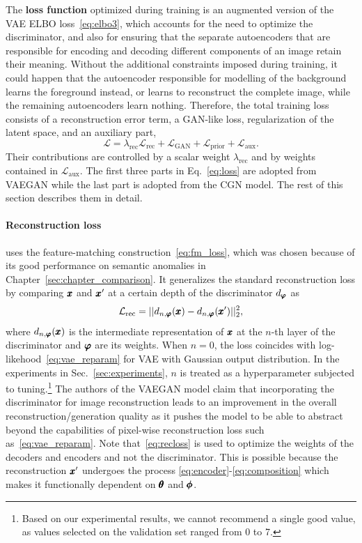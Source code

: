 The \textbf{loss function} optimized during training is an augmented version of the VAE ELBO loss~\eqref{eq:elbo3}, which accounts for the need to optimize the discriminator, and also for ensuring that the separate autoencoders that are responsible for encoding and decoding different components of an image retain their meaning. Without the additional constraints imposed during training, it could happen that the autoencoder responsible for modelling of the background learns the foreground instead, or learns to reconstruct the complete image, while the remaining autoencoders learn nothing. Therefore, the total training loss consists of a reconstruction error term, a GAN-like loss, regularization of the latent space, and an auxiliary part, 
\begin{equation}
    \mathcal{L} = \lambda_{\text{rec}}\mathcal{L}_{\text{rec}} + \mathcal{L}_{\text{GAN}} +  \mathcal{L}_{\text{prior}} + \mathcal{L}_{\text{aux}}.
    \label{eq:loss}
\end{equation}
Their contributions are controlled by a scalar weight $\lambda_{\text{rec}}$ and by weights contained in $\mathcal{L}_{\text{aux}}.$ The first three parts in Eq.~\eqref{eq:loss} are adopted from VAEGAN while the last part is adopted from the CGN model. The rest of this section describes them in detail.

\paragraph{Reconstruction loss} uses the feature-matching construction~\eqref{eq:fm_loss}, which was chosen because of its good performance on semantic anomalies in Chapter~\ref{sec:chapter_comparison}. It generalizes the standard reconstruction loss by comparing $\pmb{{x}}$ and $\pmb{{x}}'$ at a certain depth of the discriminator $d_{\pmb{{\varphi}}}$ as
\begin{equation} \label{eq:recloss}
     \mathcal{L}_{\text{rec}} = \vert \vert d_{n,\pmb{{\varphi}}}(\pmb{{x}}) - d_{n,\pmb{{\varphi}}}(\pmb{{x}}{'}) \vert \vert_2^2,
\end{equation} 
where $d_{n,\pmb{{\varphi}}}(\pmb{{x}})$ is the intermediate representation of $\pmb{{x}}$ at the $n$-th layer of the discriminator and $\pmb{{\varphi}}$ are its weights. When $n=0$, the loss coincides with log-likehood~\eqref{eq:vae_reparam} for VAE with Gaussian output distribution. In the experiments in Sec.~\ref{sec:experiments}, $n$ is treated as a hyperparameter subjected to tuning.\footnote{Based on our experimental results, we cannot recommend a single good value, as values selected on the validation set ranged from 0 to 7.} The authors of the VAEGAN model claim that incorporating the discriminator for image reconstruction leads to an improvement in the overall reconstruction/generation quality as it pushes the model to be able to abstract beyond the capabilities of pixel-wise reconstruction loss such as~\eqref{eq:vae_reparam}. Note that~\eqref{eq:recloss} is used to optimize the weights of the decoders and encoders and not the discriminator. This is possible because the reconstruction $\pmb{{x}}{'}$ undergoes the process \eqref{eq:encoder}-\eqref{eq:composition} which makes it functionally dependent on $\pmb{{\theta}}$ and $\pmb{{\phi}}$.

